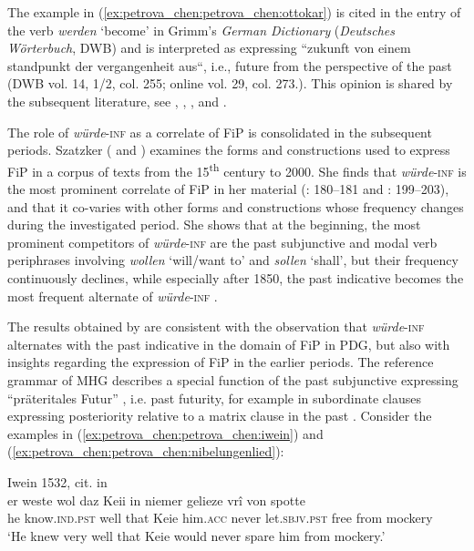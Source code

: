\documentclass[output=paper,colorlinks,citecolor=brown]{langscibook}
\begin{document}
The example in (\ref{ex:petrova_chen:petrova_chen:ottokar}) is cited in the entry of the verb \textit{werden} ‘become’ in Grimm’s \textit{German Dictionary} (\textit{Deutsches Wörterbuch}, DWB) and is interpreted as expressing ``zukunft von einem standpunkt der vergangenheit aus``, i.e., future from the perspective of the past (DWB vol. 14, 1/2, col. 255; online vol. 29, col. 273.). This opinion is shared by the subsequent literature, see \citet[206]{Wolf1981}, \citet[180]{Kotin2003}, \citet[51]{Smirnova2006}, and \citet[335]{DurrellWhitt2016}. 

The role of \textit{würde}-\textsc{inf} as a correlate of FiP is consolidated in the subsequent periods. Szatzker (\citeyear{Szatzker2002} and \citeyear{Szatzker2003}) examines the forms and constructions used to express FiP in a corpus of texts from the 15\textsuperscript{th} century to 2000. She finds that \textit{würde}-\textsc{inf} is the most prominent correlate of FiP in her material (\cite{Szatzker2002}: 180–181 and \citeyear{Szatzker2003}: 199–203), and that it co-varies with other forms and constructions whose frequency changes during the investigated period. She shows that at the beginning, the most prominent competitors of \textit{würde}-\textsc{inf} are the past subjunctive and modal verb periphrases involving \textit{wollen} ‘will/want to’ and \textit{sollen} ‘shall’, but their frequency continuously declines, while especially after 1850, the past indicative becomes the most frequent alternate of \textit{würde}-\textsc{inf} \citep[181]{Szatzker2002}.

The results obtained by \citet{Szatzker2002} are consistent with the observation that \textit{würde}-\textsc{inf} alternates with the past indicative in the domain of FiP in PDG, but also with insights regarding the expression of FiP in the earlier periods. The reference grammar of MHG \citep{Paul2007} describes a special function of the past subjunctive expressing “präteritales Futur” \citep[291]{Paul2007}, i.e. past futurity, for example in subordinate clauses expressing posteriority relative to a matrix clause in the past \citep[291, 401–402, 434 and 444–445]{Paul2007}. Consider the examples in (\ref{ex:petrova_chen:petrova_chen:iwein}) and (\ref{ex:petrova_chen:petrova_chen:nibelungenlied}):

\newpage

\ea\label{ex:petrova_chen:petrova_chen:iwein} Iwein 1532, cit. in \citet[291]{Paul2007}\\ 
    \gll er weste wol daz Keii in niemer gelieze vrî von spotte\\
    he know.\textsc{ind.pst} well that Keie him.\textsc{acc} never let.\textsc{sbjv.pst} free from mockery\\
    \glt ‘He knew very well that Keie would never spare him from mockery.’
\z
\end{document}
